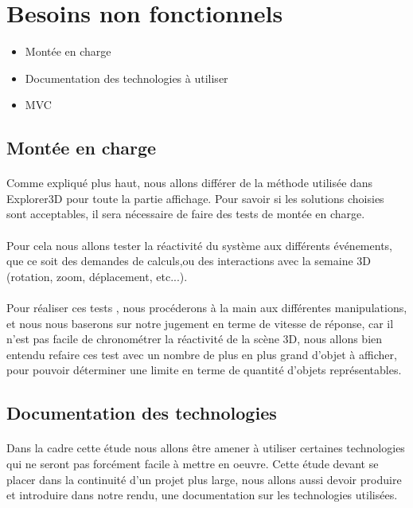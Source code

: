 \section{Besoins non fonctionnels}
\begin{itemize}
\item Montée en charge
\item Documentation des technologies à utiliser
\item MVC
\end{itemize}
\subsection{Montée en charge}
\paragraph{} Comme expliqué plus haut, nous allons différer de la méthode utilisée dans Explorer3D pour toute la partie affichage. Pour savoir si les solutions choisies sont acceptables, il sera nécessaire de faire des tests de montée en charge.

\paragraph{} Pour cela nous allons tester la réactivité du système aux différents événements, que ce soit des demandes de calculs,ou des interactions avec la semaine 3D (rotation, zoom, déplacement, etc...).

\paragraph{} Pour réaliser ces tests , nous procéderons à la main aux différentes manipulations, et nous nous baserons sur notre jugement en terme de vitesse de réponse, car il n'est pas facile de chronométrer la réactivité de la scène 3D, nous allons bien entendu refaire ces test avec un nombre de plus en plus grand d'objet à afficher, pour pouvoir déterminer une limite en terme de quantité d'objets représentables.

\newpage

\subsection{Documentation des technologies}
\paragraph{} Dans la cadre cette étude nous allons être amener à utiliser certaines technologies qui ne seront pas forcément facile à mettre en oeuvre. Cette étude devant se placer dans la continuité d'un projet plus large, nous allons aussi devoir produire et introduire dans notre rendu, une documentation sur les technologies utilisées.

